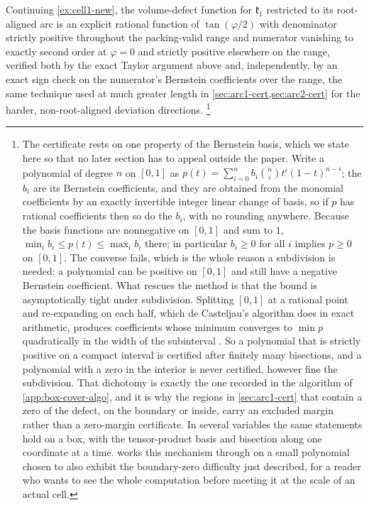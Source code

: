 \documentclass[11pt,reqno]{amsart}
\renewcommand{\_}{\origunderscore\allowbreak}
\numberwithin{equation}{section}
\theoremstyle{plain}
\theoremstyle{definition}
\theoremstyle{remark}
\newcommand{\Cell}[1]{\mathfrak{k}_{#1}}     %
\newcommand{\tilt}{\varphi}                  %
\begin{document}
Continuing \cref{ex:cell1-new}, the volume-defect function for
$\Cell1$ restricted to its root-aligned arc is an explicit rational
function of $\tan(\tilt/2)$ with denominator strictly positive
throughout the packing-valid range and numerator vanishing to exactly
second order at $\tilt=0$ and strictly positive elsewhere on the range, verified both by the exact Taylor argument above and, independently,
by an exact sign check on the numerator's Bernstein coefficients over
the range, the same technique used at much greater length in
\cref{sec:arc1-cert,sec:arc2-cert} for the harder, non-root-aligned
deviation directions.%
\footnote{The certificate rests on one property of the Bernstein basis,
  which we state here so that no later section has to appeal outside the
  paper. Write a polynomial of degree $n$ on $[0,1]$ as
  $p(t)=\sum_{i=0}^{n}b_i\binom{n}{i}t^i(1-t)^{n-i}$; the $b_i$ are its
  Bernstein coefficients, and they are obtained from the monomial
  coefficients by an exactly invertible integer linear change of basis,
  so if $p$ has rational coefficients then so do the $b_i$, with no
  rounding anywhere. Because the basis functions are nonnegative on
  $[0,1]$ and sum to $1$, $\min_i b_i\le p(t)\le\max_i b_i$ there; in
  particular $b_i\ge0$ for all $i$ implies $p\ge0$ on $[0,1]$. The
  converse fails, which is the whole reason a subdivision is needed: a
  polynomial can be positive on $[0,1]$ and still have a negative
  Bernstein coefficient. What rescues the method is that the bound is
  asymptotically tight under subdivision. Splitting $[0,1]$ at a
  rational point and re-expanding on each half, which de Casteljau's
  algorithm does in exact arithmetic, produces coefficients whose
  minimum converges to $\min p$ quadratically in the width of the
  subinterval \cite{Far12}. So a polynomial that is strictly positive on
  a compact interval is certified after finitely many bisections, and a
  polynomial with a zero in the interior is never certified, however
  fine the subdivision. That dichotomy is exactly the one recorded in
  the algorithm of \cref{app:box-cover-algo}, and it is why the
  regions in \cref{sec:arc1-cert} that contain a zero of the defect, on
  the boundary or inside, carry an excluded margin rather than a zero-margin
  certificate. In several variables the same statements hold on a box,
  with the tensor-product basis and bisection along one coordinate at a
  time.  works this mechanism through on a small
  polynomial chosen to also exhibit the boundary-zero difficulty just
  described, for a reader who wants to see the whole computation before
  meeting it at the scale of an actual cell.}
\end{document}

